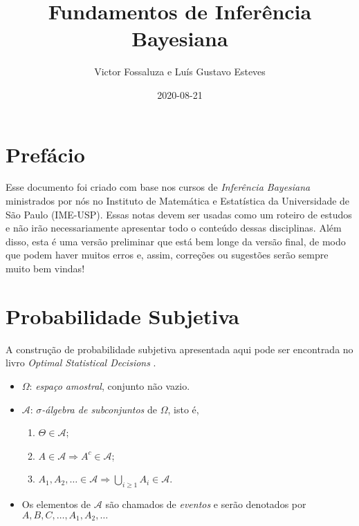 \documentclass[
]{book}
\title{Fundamentos de Inferência Bayesiana}
\author{Victor Fossaluza e Luís Gustavo Esteves}
\date{2020-08-21}
\providecommand{\tightlist}{%
  \setlength{\itemsep}{0pt}\setlength{\parskip}{0pt}}
\begin{document}
\maketitle

{
\setcounter{tocdepth}{1}
\tableofcontents
}
\hypertarget{prefuxe1cio}{%
\chapter*{Prefácio}\label{prefuxe1cio}}

Esse documento foi criado com base nos cursos de \emph{Inferência Bayesiana} ministrados por nós no Instituto de Matemática e Estatística da Universidade de São Paulo (IME-USP). Essas notas devem ser usadas como um roteiro de estudos e não irão necessariamente apresentar todo o conteúdo dessas disciplinas. Além disso, esta é uma versão preliminar que está bem longe da versão final, de modo que podem haver muitos erros e, assim, correções ou sugestões serão sempre muito bem vindas!

\hypertarget{ProbSubj}{%
\chapter{Probabilidade Subjetiva}\label{ProbSubj}}

A construção de probabilidade subjetiva apresentada aqui pode ser encontrada no livro \emph{Optimal Statistical Decisions} \citep{DeGroot70}.

\begin{itemize}
\item
  \(\Omega\): \emph{espaço amostral}, conjunto não vazio.
\item
  \(\mathcal{A}\): \emph{\(\sigma\)-álgebra de subconjuntos} de \(\Omega\), isto é,

  \begin{enumerate}
  \def\labelenumi{\arabic{enumi}.}
  \tightlist
  \item
    \(\Theta \in \mathcal{A}\);
  \item
    \(A \in \mathcal{A} \Longrightarrow A^{c} \in \mathcal{A}\);
  \item
    \(\displaystyle A_1, A_2, \ldots \in \mathcal{A} \Longrightarrow \bigcup_{i\geq1} A_i \in \mathcal{A}\).
  \end{enumerate}
\item
  Os elementos de \(\mathcal{A}\) são chamados de \emph{eventos} e serão denotados por \(A, B, C, \ldots, A_1, A_2, \ldots\)
\end{itemize}
\end{document}
